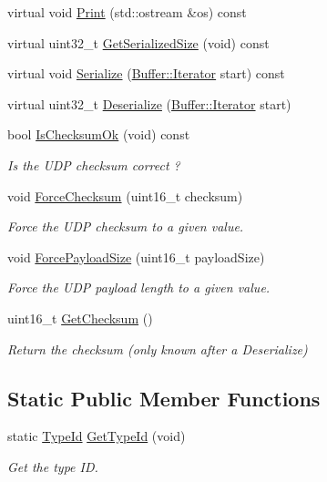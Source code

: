 \begin{DoxyCompactItemize}
\item 
virtual void \hyperlink{classns3_1_1UdpHeader_a1b5e32683c9a8a644dd59b4222cb7f26}{Print} (std\+::ostream \&os) const 
\item 
virtual uint32\+\_\+t \hyperlink{classns3_1_1UdpHeader_a1546301b5c5d2f77045011f44b870cd3}{Get\+Serialized\+Size} (void) const 
\item 
virtual void \hyperlink{classns3_1_1UdpHeader_a5243cf0bfa2bc7f510c8e6c8a5801194}{Serialize} (\hyperlink{classns3_1_1Buffer_1_1Iterator}{Buffer\+::\+Iterator} start) const 
\item 
virtual uint32\+\_\+t \hyperlink{classns3_1_1UdpHeader_a68b4a7689b1741057d91f4360eb71493}{Deserialize} (\hyperlink{classns3_1_1Buffer_1_1Iterator}{Buffer\+::\+Iterator} start)
\item 
bool \hyperlink{classns3_1_1UdpHeader_a58c55682656d4ce7141bbf26bcaf2074}{Is\+Checksum\+Ok} (void) const 
\begin{DoxyCompactList}\small\item\em Is the U\+DP checksum correct ? \end{DoxyCompactList}\item 
void \hyperlink{classns3_1_1UdpHeader_a997d40a7a083de3643f2f31494ff94bf}{Force\+Checksum} (uint16\+\_\+t checksum)
\begin{DoxyCompactList}\small\item\em Force the U\+DP checksum to a given value. \end{DoxyCompactList}\item 
void \hyperlink{classns3_1_1UdpHeader_ab8d020b0882295cdf584b750882a1605}{Force\+Payload\+Size} (uint16\+\_\+t payload\+Size)
\begin{DoxyCompactList}\small\item\em Force the U\+DP payload length to a given value. \end{DoxyCompactList}\item 
uint16\+\_\+t \hyperlink{classns3_1_1UdpHeader_ac603d77ba86b2e0a04ead4510b853ff2}{Get\+Checksum} ()
\begin{DoxyCompactList}\small\item\em Return the checksum (only known after a Deserialize) \end{DoxyCompactList}\end{DoxyCompactItemize}
\subsection*{Static Public Member Functions}
\begin{DoxyCompactItemize}
\item 
static \hyperlink{classns3_1_1TypeId}{Type\+Id} \hyperlink{classns3_1_1UdpHeader_a5480dd1bf8260cdc541643534b4ac776}{Get\+Type\+Id} (void)
\begin{DoxyCompactList}\small\item\em Get the type ID. \end{DoxyCompactList}\end{DoxyCompactItemize}
